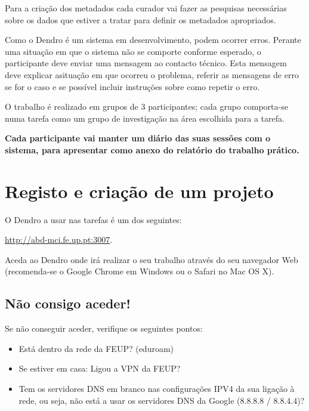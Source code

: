 \documentclass[paper=a4, fontsize=11pt]{scrartcl} %
\numberwithin{equation}{section} %
\numberwithin{figure}{section} %
\numberwithin{table}{section} %
\begin{document}
Para a criação dos metadados cada curador vai fazer as pesquisas necessárias sobre os dados que estiver a tratar para definir os metadados apropriados. 

Como o Dendro é um sistema em desenvolvimento, podem ocorrer erros. Perante uma situação em que o sistema não se comporte conforme esperado, o participante deve enviar uma mensagem ao contacto técnico. Esta mensagem deve explicar asituação em que ocorreu o problema, referir as mensagens de erro se for o caso e se possível incluir instruções sobre como repetir o erro.

O trabalho é realizado em grupos de 3 participantes; cada grupo comporta-se numa tarefa como um grupo de investigação na área escolhida para a tarefa. 

\begin{center}
	\textbf{Cada participante vai manter um diário das suas sessões com o sistema, para apresentar como anexo do relatório do trabalho prático.}
\end{center}



\section{Registo e criação de um projeto}

O Dendro a usar nas tarefas é um dos seguintes:

\begin{center}
	\url{http://abd-mci.fe.up.pt:3007}. 
	
\end{center}
	
Aceda ao Dendro onde irá realizar o seu trabalho através do seu navegador Web (recomenda-se o Google Chrome em Windows ou o Safari no Mac OS X). 

\subsection{Não consigo aceder!} %
\label{sub:nao_consigo_aceder}

Se não conseguir aceder, verifique os seguintes pontos:

\begin{itemize}
	\item Está dentro da rede da FEUP? (eduroam)
	\item Se estiver em casa: Ligou a VPN da FEUP?
	\item Tem os servidores DNS em branco nas configurações IPV4 da sua ligação à rede, ou seja, não está a usar os servidores DNS da Google (8.8.8.8 / 8.8.4.4)?
\end{itemize}
\end{document}
